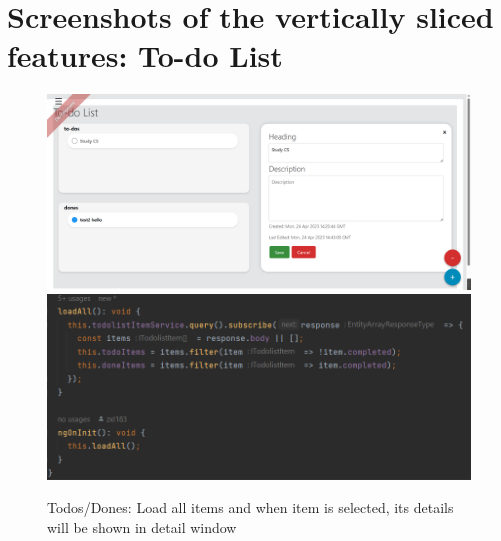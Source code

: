 \documentclass[a4paper]{article}
\begin{document}
\begin{minipage}{\textwidth}
\section{Screenshots of the vertically sliced features: To-do List}
\begin{figure}[H]
  \centering
  \begin{minipage}{0.5\textwidth}
    \centering
    \includegraphics[width=\linewidth]{./images/Interface_Details.png} 
  \end{minipage}\hfill
  \begin{minipage}{0.5\textwidth}
    \centering
    \includegraphics[width=\linewidth]{./images/Backend.png}
  \end{minipage}
  Todos/Dones: Load all items and when item is selected, its details will be shown in detail window
  

\end{figure}
\end{minipage}
\end{document}
